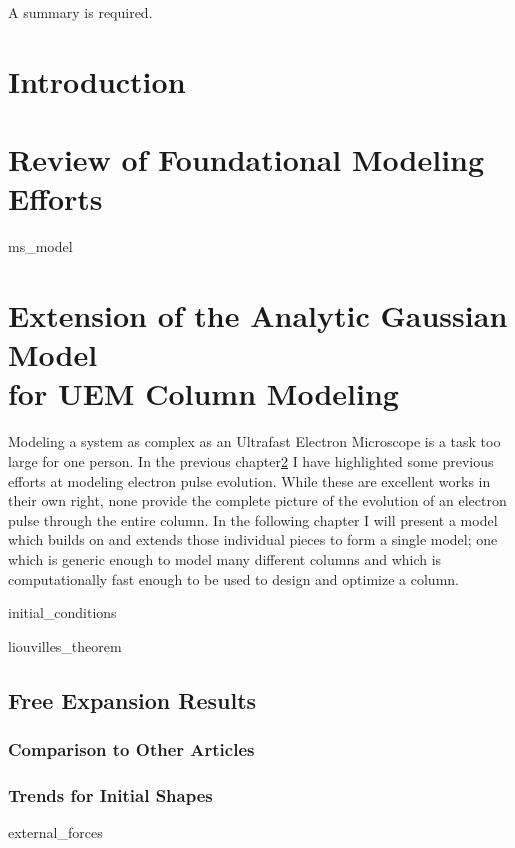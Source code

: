 \documentclass{uicthesi}
\begin{document}
\summary
A summary is required.

\chapter{Introduction}

\chapter{Review of Foundational Modeling Efforts} \label{chap:previous_models}

  {ms_model}

\chapter{Extension of the Analytic Gaussian Model\\for UEM Column Modeling}

Modeling a system as complex as an Ultrafast Electron Microscope is a task too large for one person.
In the previous chapter\ref{chap:previous_models} I have highlighted some previous efforts at modeling electron pulse evolution.
While these are excellent works in their own right, none provide the complete picture of the evolution of an electron pulse through the entire column.
In the following chapter I will present a model which builds on and extends those individual pieces to form a single model; one which is generic enough to model many different columns and which is computationally fast enough to be used to design and optimize a column.

  {initial_conditions}

  {liouvilles_theorem}

\section{Free Expansion Results}

\subsection{Comparison to Other Articles}

\subsection{Trends for Initial Shapes}

  {external_forces}
\end{document}
